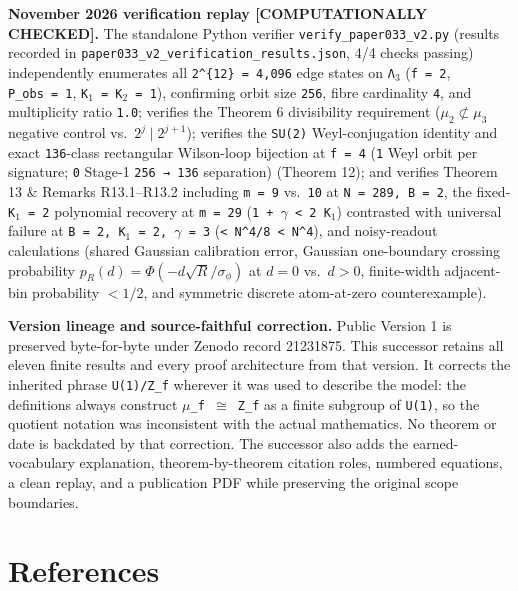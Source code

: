 \documentclass[
  american,
  11pt,
  letterpaper,
]{article}
\begin{document}
\textbf{November 2026 verification replay {[}COMPUTATIONALLY CHECKED{]}.} The standalone Python verifier \nolinkurl{verify_paper033_v2.py} (results recorded in \nolinkurl{paper033_v2_verification_results.json}, 4/4 checks passing) independently enumerates all \texttt{2\^{}\{12\}\ =\ 4,096} edge states on \texttt{Λ\ensuremath{{}_{3}}} (\texttt{f\ =\ 2}, \texttt{\textbar{}P\_obs\textbar{}\ =\ 1}, \texttt{K\ensuremath{{}_{1}}\ =\ K\ensuremath{{}_{2}}\ =\ 1}), confirming orbit size \texttt{256}, fibre cardinality \texttt{4}, and multiplicity ratio \texttt{1.0}; verifies the Theorem 6 divisibility requirement (\(\mu_2 \not\subset \mu_3\) negative control vs.~\(2^j \mid 2^{j+1}\)); verifies the \texttt{SU(2)} Weyl-conjugation identity and exact \texttt{136}-class rectangular Wilson-loop bijection at \texttt{f\ =\ 4} (\texttt{1} Weyl orbit per signature; \texttt{0} Stage-1 \texttt{256\ →\ 136} separation) (Theorem 12); and verifies Theorem 13 \& Remarks R13.1--R13.2 including \texttt{m\ =\ 9} vs.~\texttt{10} at \texttt{N\ =\ 289,\ B\ =\ 2}, the fixed-\texttt{K\ensuremath{{}_{1}}\ =\ 2} polynomial recovery at \texttt{m\ =\ 29} (\texttt{1\ +\ \ensuremath{\gamma}\ \textless{}\ 2\ K\ensuremath{{}_{1}}}) contrasted with universal failure at \texttt{B\ =\ 2,\ K\ensuremath{{}_{1}}\ =\ 2,\ \ensuremath{\gamma}\ =\ 3} (\texttt{\textless{}\ N\^{}4/8\ \textless{}\ N\^{}4}), and noisy-readout calculations (shared Gaussian calibration error, Gaussian one-boundary crossing probability \(p_R(d) = \Phi(-d\sqrt{R}/\sigma_\phi)\) at \(d = 0\) vs.~\(d > 0\), finite-width adjacent-bin probability \(< 1/2\), and symmetric discrete atom-at-zero counterexample).

\textbf{Version lineage and source-faithful correction.} Public Version 1 is preserved byte-for-byte under Zenodo record 21231875. This successor retains all eleven finite results and every proof architecture from that version. It corrects the inherited phrase \texttt{U(1)/Z\_f} wherever it was used to describe the model: the definitions always construct \texttt{\ensuremath{\mu}\_f\ \ensuremath{\cong}\ Z\_f} as a finite subgroup of \texttt{U(1)}, so the quotient notation was inconsistent with the actual mathematics. No theorem or date is backdated by that correction. The successor also adds the earned-vocabulary explanation, theorem-by-theorem citation roles, numbered equations, a clean replay, and a publication PDF while preserving the original scope boundaries.

\section{References}\label{references}
\end{document}
